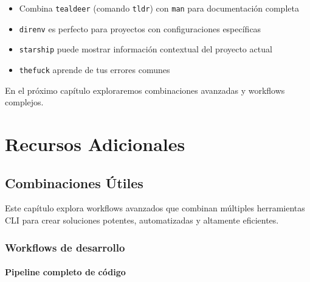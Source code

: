 \documentclass[
  11pt,
  letterpaper,
  oneside,
  openany]{scrbook}
\providecommand{\tightlist}{%
  \setlength{\itemsep}{0pt}\setlength{\parskip}{0pt}}
\begin{document}
\begin{tcolorbox}[enhanced jigsaw, toprule=.15mm, bottomrule=.15mm, opacityback=0, coltitle=black, rightrule=.15mm, colframe=quarto-callout-tip-color-frame, titlerule=0mm, opacitybacktitle=0.6, left=2mm, colback=white, bottomtitle=1mm, arc=.35mm, leftrule=.75mm, title=\textcolor{quarto-callout-tip-color}{\faLightbulb}\hspace{0.5em}{Tips para utilidades}, colbacktitle=quarto-callout-tip-color!10!white, breakable, toptitle=1mm]

\begin{itemize}
\tightlist
\item
  Combina \texttt{tealdeer} (comando \texttt{tldr}) con \texttt{man}
  para documentación completa
\item
  \texttt{direnv} es perfecto para proyectos con configuraciones
  específicas
\item
  \texttt{starship} puede mostrar información contextual del proyecto
  actual
\item
  \texttt{thefuck} aprende de tus errores comunes
\end{itemize}

\end{tcolorbox}

En el próximo capítulo exploraremos combinaciones avanzadas y workflows
complejos.

\part{Recursos Adicionales}

\chapter{Combinaciones Útiles}\label{combinaciones-uxfatiles}

Este capítulo explora workflows avanzados que combinan múltiples
herramientas CLI para crear soluciones potentes, automatizadas y
altamente eficientes.

\section{Workflows de desarrollo}\label{workflows-de-desarrollo}

\subsection{Pipeline completo de
código}\label{pipeline-completo-de-cuxf3digo}
\end{document}
